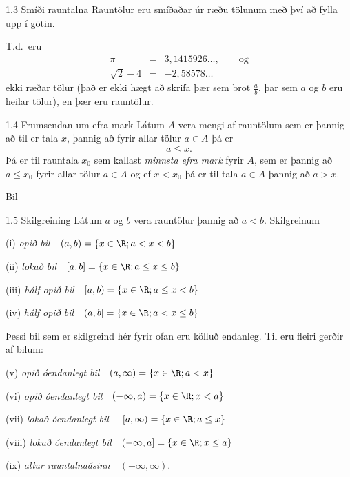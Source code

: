 \documentclass[icelandic,a4paper,12pt]{article}
\begin{document}
\begin{frame}
\begin{block}{1.3 Smíði rauntalna}  Rauntölur eru smíðaðar úr ræðu tölunum
með því að fylla upp í götin. 

\pause

T.d.~eru 
\begin{eqnarray*}
\pi &=& 3,1415926\ldots, \qquad \text{og}\\
\sqrt 2 -4  &=& -2,58578\ldots
\end{eqnarray*}
ekki ræðar tölur (það er ekki hægt að skrifa þær sem brot $\frac ab$, 
þar sem $a$ og $b$ eru heilar tölur), en þær eru rauntölur.
\end{block}

\pause


\begin{block}{1.4 Frumsendan um efra mark}  
Látum $A$ vera mengi af  rauntölum
sem er þannig að til er tala $x$, þannig að 
fyrir allar tölur $a \in A$ þá er 
$$a\leq x.$$ 
Þá er til rauntala $x_0$ sem kallast {\em minnsta efra mark} fyrir
$A$, sem er þannig að  $a\leq x_0$ fyrir allar tölur $a\in
A$ og ef $x<x_0$ þá er til tala $a\in A$ þannig að $a>x$.  
\end{block}
\end{frame}


\begin{frame}{Bil}
\begin{block}{1.5 Skilgreining}  
Látum $a$ og $b$ vera rauntölur þannig að $a<b$.  
Skilgreinum 

(i) {\em opið bil}\ \ $(a,b)=\{x\in \R ; a<x<b\}$

(ii) {\em lokað bil}\ \ $[a,b]=\{x\in \R ; a\leq x\leq b\}$

(iii) {\em hálf opið bil}\ \ $[a,b)=\{x\in \R ; a\leq x<b\}$

(iv) {\em hálf opið bil}\ \ $(a,b]=\{x\in \R ; a< x\leq b\}$

\medskip

Þessi bil sem er skilgreind hér fyrir ofan eru kölluð endanleg.  Til
eru fleiri gerðir af bilum:

(v)  {\em opið óendanlegt bil}\ \    $(a,\infty)=\{x\in \R ; a<x\}$

(vi)  {\em opið óendanlegt bil}\ \    $(-\infty, a)=\{x\in \R ; x<a\}$

(vii)  {\em lokað óendanlegt bil} \ \ $[a,\infty)=\{x\in \R ; a\leq x\}$

(viii)  {\em lokað óendanlegt bil}\ \  $(-\infty, a]=\{x\in \R ; x\leq a\}$

(ix)  {\em allur rauntalnaásinn}\ \  $(-\infty, \infty)$.
\end{block}
\end{frame}
\end{document}
